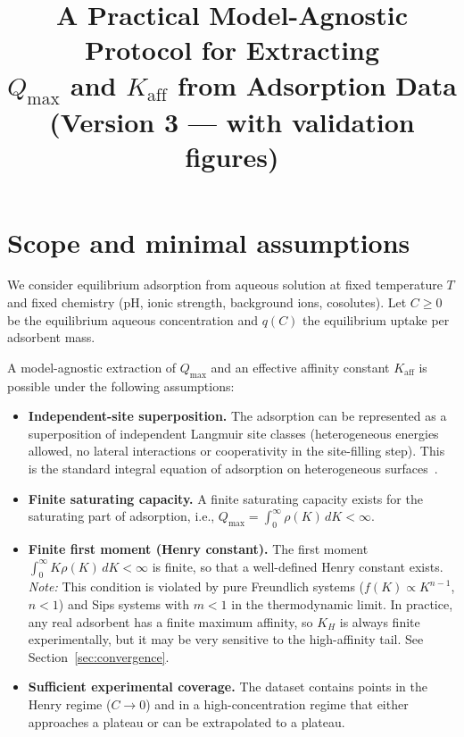 \documentclass[12pt]{article}
\begin{document}
\title{A Practical Model-Agnostic Protocol for Extracting\\
$Q_{\max}$ and $K_{\mathrm{aff}}$ from Adsorption Data\\[6pt]
\large (Version 3 --- with validation figures)}
\author{}
\date{}
\maketitle

\section{Scope and minimal assumptions}

We consider equilibrium adsorption from aqueous solution at fixed
temperature $T$ and fixed chemistry (pH, ionic strength, background ions,
cosolutes).  Let $C\ge 0$ be the equilibrium aqueous concentration and
$q(C)$ the equilibrium uptake per adsorbent mass.

A model-agnostic extraction of $Q_{\max}$ and an effective affinity
constant $K_{\mathrm{aff}}$ is possible under the following assumptions:

\begin{itemize}
  \item[A1.] \textbf{Independent-site superposition.}  The adsorption
        can be represented as a superposition of independent Langmuir
        site classes (heterogeneous energies allowed, no lateral
        interactions or cooperativity in the site-filling step).
        This is the standard integral equation of adsorption on
        heterogeneous surfaces~\cite{Sips1948,Jaroniec1988,Rudzinski1992}.
  \item[A2.] \textbf{Finite saturating capacity.}  A finite saturating
        capacity exists for the saturating part of adsorption, i.e.,
        $Q_{\max}=\int_0^\infty\rho(K)\,dK<\infty$.
  \item[A3.] \textbf{Finite first moment (Henry constant).}  The first
        moment $\int_0^\infty K\rho(K)\,dK<\infty$ is finite, so that a
        well-defined Henry constant exists.
        \emph{Note:} This condition is violated by pure Freundlich
        systems ($f(K)\propto K^{n-1}$, $n<1$) and Sips systems with
        $m<1$ in the thermodynamic limit.  In practice, any real
        adsorbent has a finite maximum affinity, so $K_H$ is always
        finite experimentally, but it may be very sensitive to the
        high-affinity tail.  See Section~\ref{sec:convergence}.
  \item[A4.] \textbf{Sufficient experimental coverage.}  The dataset
        contains points in the Henry regime ($C\to 0$) and in a
        high-concentration regime that either approaches a plateau or
        can be extrapolated to a plateau.
\end{itemize}
\end{document}
